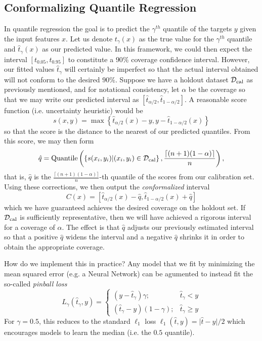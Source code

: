 \subsection{Conformalizing Quantile Regression}

In quantile regression the goal is to predict the $\gamma^{th}$ quantile of the
targets $y$ given the input features $x$. Let us denote $t_\gamma(x)$ as the
true value for the $\gamma^{th}$ quantile and $\hat{t}_\gamma(x)$ as our
predicted value. In this framework, we could then expect the interval
$[t_{0.05}, t_{0.95}]$ to constitute a $90\%$ coverage confidence interval.
However, our fitted values $\hat{t}_\gamma$ will certainly be imperfect so that
the actual interval obtained will not conform to the desired $90\%$. Suppose we
have a holdout dataset $\mathcal{D}_{\text{cal}}$ as previously mentioned, and for
notational consistency, let $\alpha$ be the coverage so that we may write our
predicted interval as $[\hat{t}_{\alpha/2}, \hat{t}_{1-\alpha/2}]$. A reasonable
score function (i.e. uncertainty heuristic) would be
\begin{equation}
  s(x,y) = \max\left\{\hat{t}_{\alpha/2}(x)-y, y-\hat{t}_{1-\alpha/2}(x) \right\}
\end{equation}
so that the score is the distance to the nearest of our predicted quantiles.
From this score, we may then form
\begin{equation}
  \hat{q} = \text{Quantile}\left(\left\{ s(x_i,y_i) \vert (x_i,y_i)\in\mathcal{D}_{\text{cal}}\right\}, \frac{\lceil (n+1)(1-\alpha) \rceil}{n}\right),
\end{equation}
that is, $\hat{q}$ is the  $\frac{\lceil (n+1)(1-\alpha) \rceil}{n}$-th quantile
of the scores from our calibration set. Using these corrections, we then output
the \textit{conformalized} interval
\begin{equation}
  C(x) = \left[ \hat{t}_{\alpha/2}(x)-\hat{q}, \hat{t}_{1-\alpha/2}(x)+\hat{q} \right]
\end{equation}
which we have guaranteed achieves the desired coverage on the holdout set. If
$\mathcal{D}_{\text{cal}}$ is sufficiently representative, then we will have achieved a
rigorous interval for a coverage of $\alpha$. The effect is that $\hat{q}$
adjusts our previously estimated interval so that a positive $\hat{q}$ widens
the interval and a negative $\hat{q}$ shrinks it in order to obtain the
appropriate coverage.

How do we implement this in practice? Any model that we fit by minimizing the
mean squared error (e.g. a Neural Network) can be agumented to instead fit the
so-called \textit{pinball loss}
\begin{equation}
  L_\gamma(\hat{t}_{\gamma}, y) = \begin{cases}
    (y-\hat{t}_{\gamma})\gamma; & \hat{t}_{\gamma} < y \\
    (\hat{t}_{\gamma}-y)(1-\gamma); & \hat{t}_{\gamma} \geq y
    \end{cases}
\end{equation}
For $\gamma=0.5$, this reduces to the standard $\ell_1$ loss $\ell_1(\hat{t},y)
= \lvert \hat{t}-y\rvert/2$ which encourages models to learn the median (i.e.
the $0.5$ quantile).

